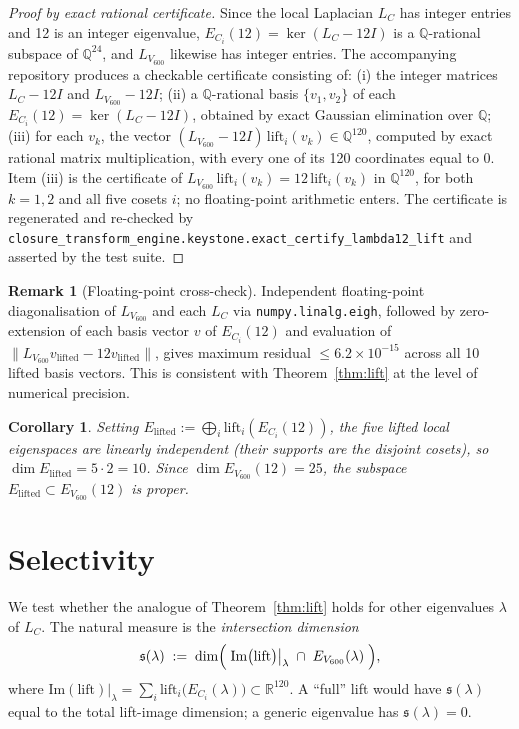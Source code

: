 \documentclass[11pt]{article}
\newcommand{\Vsix}{V_{600}}
\newcommand{\Lsix}{L_{\Vsix}}
\newcommand{\Loc}{L_{C}}
\newcommand{\Esix}{E_{\Vsix}}
\newcommand{\Elift}{E_{\mathrm{lifted}}}
\theoremstyle{plain}
\newtheorem{corollary}[theorem]{Corollary}
\theoremstyle{definition}
\newtheorem{remark}[theorem]{Remark}
\begin{document}
\begin{proof}[Proof by exact rational certificate]
Since the local Laplacian $\Loc$ has integer entries and 12 is an
integer eigenvalue, $E_{C_i}(12) = \ker(\Loc - 12I)$ is a
$\mathbb{Q}$-rational subspace of $\mathbb{Q}^{24}$, and $\Lsix$
likewise has integer entries.  The accompanying repository produces
a checkable certificate consisting of:
(i) the integer matrices $\Loc - 12I$ and $\Lsix - 12I$;
(ii) a $\mathbb{Q}$-rational basis $\{v_1, v_2\}$ of each
$E_{C_i}(12) = \ker(\Loc - 12I)$, obtained by exact Gaussian
elimination over $\mathbb{Q}$;
(iii) for each $v_k$, the vector $(\Lsix - 12I)\,\mathrm{lift}_i(v_k)
\in \mathbb{Q}^{120}$, computed by exact rational matrix
multiplication, with every one of its 120 coordinates equal to $0$.
Item (iii) is the certificate of $\Lsix\,\mathrm{lift}_i(v_k) =
12\,\mathrm{lift}_i(v_k)$ in $\mathbb{Q}^{120}$, for both $k=1,2$
and all five cosets $i$; no floating-point arithmetic enters.  The
certificate is regenerated and re-checked by
\texttt{closure\_transform\_engine.keystone.exact\_certify\_lambda12\_lift}
and asserted by the test suite.
\end{proof}

\begin{remark}[Floating-point cross-check]\label{rmk:floatcheck}
Independent floating-point diagonalisation of $\Lsix$ and each $\Loc$
via \texttt{numpy.linalg.eigh}, followed by zero-extension of each
basis vector $v$ of $E_{C_i}(12)$ and evaluation of
$\|\Lsix v_{\mathrm{lifted}} - 12 v_{\mathrm{lifted}}\|$, gives
maximum residual $\le 6.2\times10^{-15}$ across all 10 lifted basis
vectors.  This is consistent with Theorem~\ref{thm:lift} at the
level of numerical precision.
\end{remark}

\begin{corollary}\label{cor:dim}
Setting $\Elift := \bigoplus_i \mathrm{lift}_i(E_{C_i}(12))$, the
five lifted local eigenspaces are linearly independent (their
supports are the disjoint cosets), so
$\dim \Elift = 5\cdot 2 = 10$.  Since $\dim \Esix(12) = 25$, the
subspace $\Elift\subset\Esix(12)$ is proper.
\end{corollary}

\section{Selectivity}\label{sec:selectivity}

We test whether the analogue of Theorem~\ref{thm:lift} holds for
other eigenvalues $\lambda$ of $\Loc$.  The natural measure is the
\emph{intersection dimension}
\[
  \mathfrak{s}(\lambda) \;:=\; \dim\Bigl(\;
     \mathrm{Im}\bigl(\mathrm{lift}\bigr)\big|_{\lambda}
     \;\cap\;\Esix(\lambda)\;\Bigr),
\]
where $\mathrm{Im}(\mathrm{lift})\big|_{\lambda} = \sum_i
\mathrm{lift}_i\bigl(E_{C_i}(\lambda)\bigr)\subset\mathbb{R}^{120}$.
A ``full'' lift would have $\mathfrak{s}(\lambda)$ equal to the
total lift-image dimension; a generic eigenvalue has
$\mathfrak{s}(\lambda)=0$.
\end{document}
